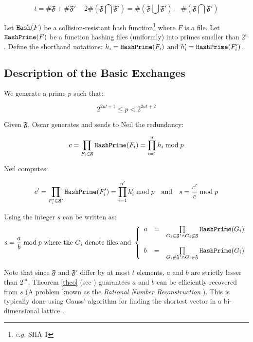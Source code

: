 \documentclass[11pt]{llncs}
\begin{document}
$$t=\#\mathfrak{F}+\#\mathfrak{F}'-2 \#\left(\mathfrak{F} \bigcap \mathfrak{F}'\right)=\#\left(\mathfrak{F}\bigcup\mathfrak{F}'\right)-\#\left(\mathfrak{F}\bigcap\mathfrak{F}'\right)$$

Let $\mbox{{\tt Hash}}(F)$ be a collision-resistant hash function\footnote{{\sl e.g.} SHA-1} where $F$ is a file. Let $\mbox{{\tt HashPrime}}(F)$ be a function hashing files (uniformly) into primes smaller than $2^u$. Define the shorthand notations: $h_i=\mbox{{\tt HashPrime}}(F_i)$ and $h'_i=\mbox{{\tt HashPrime}}(F'_i)$.\smallskip

\subsection{Description of the Basic Exchanges}
\label{basic}

We generate a prime $p$ such that:

\begin{equation}
\label{equp}
2^{2ut+1} \leq p < 2^{2ut+2}
\end{equation}

Given $\mathfrak{F}$, Oscar generates and sends to Neil the redundancy:

$$
c=\prod_{F_i\in \mathfrak{F}} \mbox{{\tt HashPrime}}(F_i)=\prod_{i=1}^n h_i \bmod p
$$

Neil computes:\smallskip

$$c'=\prod_{F'_i\in \mathfrak{F'}} \mbox{{\tt HashPrime}}(F'_i)=\prod_{i=1}^{n'} h'_i \bmod p{~~~\mbox{and}~~~}s=\frac{c'}{c} \bmod p$$

Using \cite{vallee} the integer $s$ can be written as:
$$s=\frac{a}{b} \bmod p{\mbox{~where the~}G_i\mbox{~denote files and~}}
\left\{
\begin{array}{lcr}
a & =&  \prod\limits_{G_i \in \mathfrak{F}'\wedge G_i \not\in\mathfrak{F}} \mbox{{\tt HashPrime}}(G_i) \\
\\
b & = & \prod\limits_{G_i \not\in\mathfrak{F}' \wedge G_i \in\mathfrak{F}} \mbox{{\tt HashPrime}}(G_i)
\end{array}
\right.
$$

Note that since $\mathfrak{F}$ and $\mathfrak{F}'$ differ by at most $t$ elements, $a$ and $b$ are strictly lesser than $2^{ut}$. Theorem \ref{theo} (see \cite{cryptorational}) guarantees $a$ and $b$ can be efficiently recovered from $s$ (A problem  known as the {\sl Rational Number Reconstruction} \cite{pan2004rational,wang2003acceleration}). This is typically done using Gauss' algorithm for finding the shortest vector in a bi-dimensional lattice \cite{vallee}.
\end{document}
